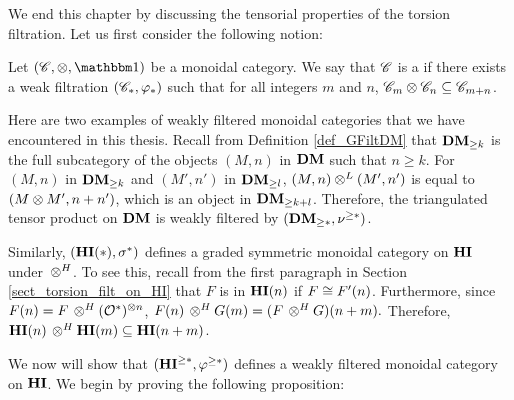 We end this chapter by discussing the tensorial properties of the 
torsion filtration. Let us first consider the following notion:

\begin{defn}\label{def_graded_tensor}
Let $(\Cat{C}, \tensor, \Unit)$ be a monoidal category. We say 
that $\Cat{C}$ is a  if there 
exists a weak filtration $(\Cat{C}_*, \phi_*)$ such that for all
integers $m$ and $n$, $\Cat{C}_m \tensor \Cat{C}_n \subseteq
\Cat{C}_{m + n}$.
\end{defn}

\begin{ex}
Here are two examples of weakly filtered monoidal categories
that we have encountered in this thesis. Recall from Definition 
\ref{def_GFiltDM} that $\GFiltDM[k]{\DM}$ is the full subcategory
of the objects $(M, n)$ in $\DM$ such that $n \geq k$. For $(M, n)$
in $\GFiltDM[k]{\DM}$ and $(M', n')$ in $\GFiltDM[l]{\DM}$, $(M, n) \tDM (M', n')$
is equal to $(M \tensor M', n + n')$, which is an object in $\GFiltDM[k + l]{\DM}$.
Therefore, the triangulated tensor product on $\DM$ is weakly filtered
by $(\GFiltDM[*]{\DM}, \sgDM{*})$.

Similarly, $(\HI(*), \sgHI{*})$ defines a graded symmetric 
monoidal category on $\HI$ under $\tHI$. To see this, recall
from the first paragraph in Section \ref{sect_torsion_filt_on_HI}
that $F$ is in $\LHI[n]{\HI}$ if $F \cong \LHI[n]{F'}$. 
Furthermore, since $\LHI[n]{F} = F \tHI (\Ox)^{\tensor n}$, 
$\LHI[n]{F} \tHI \LHI[m]{G} = \LHI[n + m]{(F \tHI G)}.$ Therefore, 
$\LHI[n]{\HI} \tHI \LHI[m]{\HI} \subseteq \LHI[n + m]{\HI}$.
\end{ex}

We now will show that $(\THI{*}, \tgHI{*})$ defines a weakly filtered 
monoidal category on $\HI$. We begin by proving the following
proposition:

